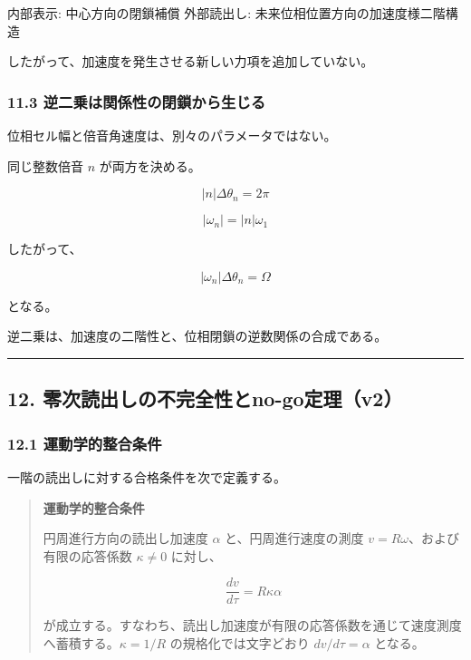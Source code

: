 \documentclass[
  a4paper,
]{ltjsarticle}
\newenvironment{Shaded}{}{}
\newcommand{\NormalTok}[1]{#1}
\begin{document}
\begin{Shaded}
\begin{Highlighting}[]
\NormalTok{内部表示: 中心方向の閉鎖補償}
\NormalTok{外部読出し: 未来位相位置方向の加速度様二階構造}
\end{Highlighting}
\end{Shaded}

したがって、加速度を発生させる新しい力項を追加していない。

\subsubsection{11.3
逆二乗は関係性の閉鎖から生じる}\label{ux9006ux4e8cux4e57ux306fux95a2ux4fc2ux6027ux306eux9589ux9396ux304bux3089ux751fux3058ux308b}

位相セル幅と倍音角速度は、別々のパラメータではない。

同じ整数倍音 \(n\) が両方を決める。

\[
|n|\Delta\theta_n=2\pi
\]

\[
|\omega_n|=|n|\omega_1
\]

したがって、

\[
|\omega_n|\Delta\theta_n=\Omega
\]

となる。

逆二乗は、加速度の二階性と、位相閉鎖の逆数関係の合成である。

\begin{center}\rule{0.5\linewidth}{0.5pt}\end{center}

\subsection{12.
零次読出しの不完全性とno-go定理（v2）}\label{ux96f6ux6b21ux8aadux51faux3057ux306eux4e0dux5b8cux5168ux6027ux3068no-goux5b9aux7406v2}

\subsubsection{12.1
運動学的整合条件}\label{ux904bux52d5ux5b66ux7684ux6574ux5408ux6761ux4ef6}

一階の読出しに対する合格条件を次で定義する。

\begin{quote}
\textbf{運動学的整合条件}

円周進行方向の読出し加速度 \(\alpha\) と、円周進行速度の測度
\(v=R\omega\)、および有限の応答係数 \(\kappa\ne0\) に対し、

\[
\frac{dv}{d\tau}=R\kappa\alpha
\]

が成立する。すなわち、読出し加速度が有限の応答係数を通じて速度測度へ蓄積する。\(\kappa=1/R\)
の規格化では文字どおり \(dv/d\tau=\alpha\) となる。
\end{quote}
\end{document}
